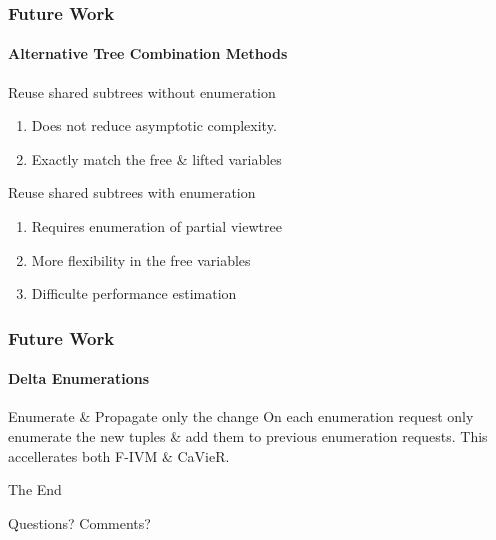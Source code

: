 \documentclass[
	11pt, %
]{beamer}
\begin{document}
\begin{frame}
	\frametitle{Future Work}
	\framesubtitle{Alternative Tree Combination Methods}
	\begin{block}{Reuse shared subtrees without enumeration}
		\begin{enumerate}
			\item Does not reduce asymptotic complexity.
			\item Exactly match the free \& lifted variables
		\end{enumerate}
	\end{block}
	
		\begin{block}{Reuse shared subtrees with enumeration}
		\begin{enumerate}
			\item Requires enumeration of partial viewtree
			\item More flexibility in the free variables
			\item Difficulte performance estimation
		\end{enumerate}
	\end{block}
\end{frame}

\begin{frame}
	\frametitle{Future Work}
	\framesubtitle{Delta Enumerations}
	\begin{block}{Enumerate \& Propagate only the change}
		On each enumeration request only enumerate the new tuples \& add them to previous enumeration requests.
		This accellerates both F-IVM \& CaVieR.
	\end{block}
\end{frame}

\begin{frame}[plain] %
	\begin{center}
		{\Huge The End}
		
		\bigskip\bigskip %
		
		{\LARGE Questions? Comments?}
	\end{center}
\end{frame}

\end{document}
